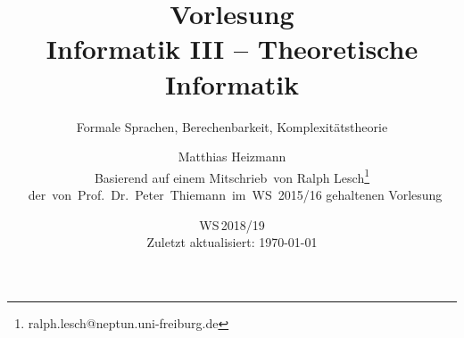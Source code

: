 \documentclass[11pt,paper=a4,titlepage,headsepline,ngerman,listof=totoc]{scrartcl}
\begin{document}
\title{Vorlesung \\Informatik III -- Theoretische Informatik}
\subtitle{Formale Sprachen, Berechenbarkeit, Komplexitätstheorie}
\author{Matthias Heizmann\\\normalsize{Basierend auf einem Mitschrieb\ von Ralph Lesch\thanks{ralph.lesch@neptun.uni-freiburg.de}}\\\normalsize{\ der\ von\ Prof.\ Dr.\ Peter\ Thiemann\ im\ WS\, 2015/16 gehaltenen Vorlesung}}
\date{WS\,2018/19%
  \\
  \vspace{10ex}
\small\sffamily Zuletzt aktualisiert: \today}

\maketitle

\vspace{\baselineskip}
\tableofcontents





% 
% 
% 
% 
\end{document}
